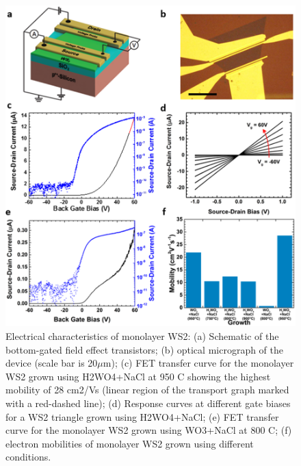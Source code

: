 \documentclass[12pt]{article}
\begin{document}
\begin{figure}[h]
\begin{center}
\includegraphics[scale=0.3]{PaperElectricalMeasurementMonolayer.png}
\caption{Electrical characteristics of monolayer WS2: (a) Schematic of the bottom-gated field effect transistors; (b) optical micrograph of the device (scale bar is 20${\mu}$m); (c) FET transfer curve for the monolayer WS2 grown using H2WO4+NaCl at 950 {\degree}C showing the highest mobility of 28 cm2/Vs (linear region of the transport graph marked with a red-dashed line); (d) Response curves at different gate biases for a WS2 triangle grown using H2WO4+NaCl; (e) FET transfer curve for the monolayer WS2 grown using WO3+NaCl at 800 {\degree}C; (f) electron mobilities of monolayer WS2 grown using different conditions.}
\label{fig:PaperElectricalMeasurementMonolayer}
\end{center}
\end{figure}
\end{document}
